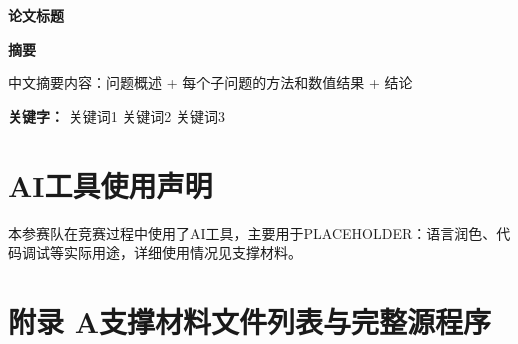 \documentclass[12pt, a4paper]{ctexart}
\newcommand{\papertitle}[1]{%
  \begin{center}
    {\fontsize{17.3pt}{22pt}\bfseries #1}
  \end{center}
  \vspace{1em}
}
\newcommand{\abstractcn}[2]{%
  \begin{center}{\fontsize{14pt}{17pt}\bfseries 摘要}\end{center}
  #1\par
  \vspace{1em}
  {\heiti\bfseries 关键字：}#2\par
  \clearpage
}
\newcommand{\referencescn}{%
}
\newcommand{\appendixcn}{%
  \section*{附录 A\quad 支撑材料文件列表与完整源程序}%
}
\newcommand{\CumcmAINotUsed}{%
  \section*{AI工具使用声明}%
  本参赛队在竞赛过程中未使用任何AI工具。%
}
\newcommand{\CumcmAIUsed}[1]{%
  \section*{AI工具使用声明}%
  本参赛队在竞赛过程中使用了AI工具，主要用于#1，详细使用情况见支撑材料。%
}
\begin{document}
\setcounter{page}{1}

\papertitle{论文标题}

\abstractcn{%
  中文摘要内容：问题概述 + 每个子问题的方法和数值结果 + 结论%
}{%
  关键词1 \quad 关键词2 \quad 关键词3%
}











\newpage
\CumcmAIUsed{PLACEHOLDER：语言润色、代码调试等实际用途}
\newpage
\referencescn
\newpage
\appendixcn
\end{document}
